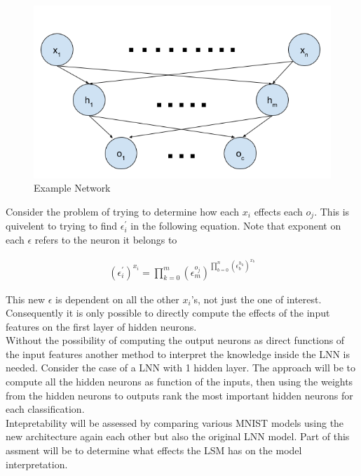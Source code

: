 \begin{figure}[H]
	\centering
	\begin{minipage}[b]{0.5\textwidth}
		\includegraphics[width=\textwidth]{NetworkExample.png}
		\caption{Example Network}
		\label{fig:network-example}
	\end{minipage}
	\hfill
\end{figure}

Consider the problem of trying to determine how each $x_i$ effects each $o_j$. This is quivelent to trying to find $\epsilon^{'}_i$ in the following equation. Note that exponent on each $\epsilon$ refers to the neuron it belongs to

\begin{align*}
	(\epsilon^{'}_i)^{x_i} = \prod_{k = 0}^{m} (\epsilon^{o_j}_m)^{\prod_{b = 0}^{n} (\epsilon^{h_k}_b)^{x_b}}
\end{align*}

This new $\epsilon$ is dependent on all the other $x_i$'s, not just the one of interest. Consequently it is only possible to directly compute the effects of the input features on the first layer of hidden neurons.\\

Without the possibility of computing the output neurons as direct functions of the input features another method to interpret the knowledge inside the LNN is needed. Consider the case of a LNN with 1 hidden layer. The approach will be to compute all the hidden neurons as function of the inputs, then using the weights from the hidden neurons to outputs rank the most important hidden neurons for each classification.\\

Intepretability will be assessed by comparing various MNIST models using the new architecture again each other but also the original LNN model. Part of this assment will be to determine what effects the LSM has on the model interpretation.\\

